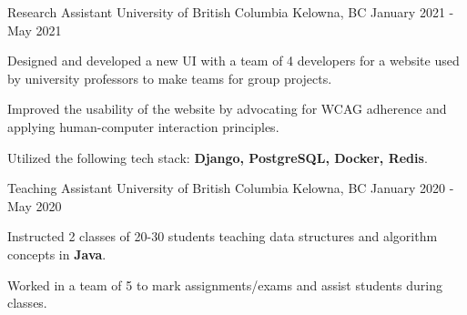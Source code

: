 \begin{cventries}


	\cventry
	{Research Assistant } %
	{University of British Columbia } %
	{Kelowna, BC } %
	{January 2021 - May 2021} %
	{
		\begin{cvitems} %
			\item {Designed and developed a new UI with a team of 4 developers for a website used by university professors to make teams for group projects.}
			\item {Improved the usability of the website by advocating for WCAG adherence and applying human-computer interaction principles.} \item {Utilized the following tech stack:  \textbf{Django, PostgreSQL, Docker, Redis}.}
		\end{cvitems}
	}


	\cventry
	{Teaching Assistant } %
	{University of British Columbia } %
	{Kelowna, BC } %
	{January 2020 - May 2020} %
	{
		\begin{cvitems} %
			\item {Instructed 2 classes of 20-30 students teaching data structures and algorithm concepts in \textbf{Java}.}
			\item {Worked in a team of 5 to mark assignments/exams and assist students during classes.}
		\end{cvitems}
	}


\end{cventries}
